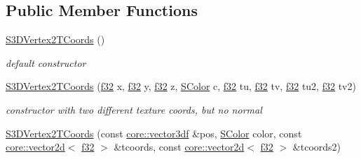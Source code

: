 \subsection*{Public Member Functions}
\begin{DoxyCompactItemize}
\item 
\mbox{\label{structirr_1_1video_1_1S3DVertex2TCoords_a576818fd5d7b120a8266a5f0f6ea8215}} 
\hyperlink{structirr_1_1video_1_1S3DVertex2TCoords_a576818fd5d7b120a8266a5f0f6ea8215}{S3\+D\+Vertex2\+T\+Coords} ()
\begin{DoxyCompactList}\small\item\em default constructor \end{DoxyCompactList}\item 
\mbox{\label{structirr_1_1video_1_1S3DVertex2TCoords_a8a1284825d35ca6448f694688ba2337b}} 
\hyperlink{structirr_1_1video_1_1S3DVertex2TCoords_a8a1284825d35ca6448f694688ba2337b}{S3\+D\+Vertex2\+T\+Coords} (\hyperlink{namespaceirr_a0277be98d67dc26ff93b1a6a1d086b07}{f32} x, \hyperlink{namespaceirr_a0277be98d67dc26ff93b1a6a1d086b07}{f32} y, \hyperlink{namespaceirr_a0277be98d67dc26ff93b1a6a1d086b07}{f32} z, \hyperlink{classirr_1_1video_1_1SColor}{S\+Color} c, \hyperlink{namespaceirr_a0277be98d67dc26ff93b1a6a1d086b07}{f32} tu, \hyperlink{namespaceirr_a0277be98d67dc26ff93b1a6a1d086b07}{f32} tv, \hyperlink{namespaceirr_a0277be98d67dc26ff93b1a6a1d086b07}{f32} tu2, \hyperlink{namespaceirr_a0277be98d67dc26ff93b1a6a1d086b07}{f32} tv2)
\begin{DoxyCompactList}\small\item\em constructor with two different texture coords, but no normal \end{DoxyCompactList}\item 
\mbox{\label{structirr_1_1video_1_1S3DVertex2TCoords_a9fa652c1a470fd17548cfacb5e0dfa31}} 
\hyperlink{structirr_1_1video_1_1S3DVertex2TCoords_a9fa652c1a470fd17548cfacb5e0dfa31}{S3\+D\+Vertex2\+T\+Coords} (const \hyperlink{namespaceirr_1_1core_ae6e2b2a6c552833ebbd5b7463d03586b}{core\+::vector3df} \&pos, \hyperlink{classirr_1_1video_1_1SColor}{S\+Color} color, const \hyperlink{classirr_1_1core_1_1vector2d}{core\+::vector2d}$<$ \hyperlink{namespaceirr_a0277be98d67dc26ff93b1a6a1d086b07}{f32} $>$ \&tcoords, const \hyperlink{classirr_1_1core_1_1vector2d}{core\+::vector2d}$<$ \hyperlink{namespaceirr_a0277be98d67dc26ff93b1a6a1d086b07}{f32} $>$ \&tcoords2)

\end{DoxyCompactItemize}
